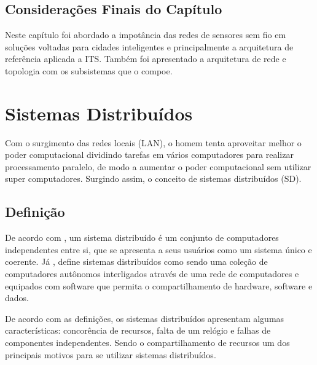 \documentclass[
	12pt,				%
	oneside,			%
	a4paper,			%
	english,			%
	brazil				%
	]{abntex2ppgsi}
\begin{document}

\section{Considerações Finais do Capítulo}

Neste capítulo foi abordado a impotância das redes de sensores sem fio em soluções voltadas para cidades inteligentes e principalmente  a arquitetura de referência aplicada a ITS. Também foi apresentado a arquitetura de rede e topologia com os subsistemas que o compoe.

\chapter{Sistemas Distribuídos}

Com o surgimento das redes locais (LAN), o homem tenta aproveitar melhor o poder computacional dividindo tarefas em vários computadores para realizar processamento paralelo, de modo a aumentar o poder computacional sem utilizar super computadores. Surgindo assim, o conceito de sistemas distribuídos (SD).

\section{Definição}

De acordo com , um sistema distribuído é um conjunto de computadores independentes entre si, que se apresenta a seus usuários como um sistema único e coerente. Já  , define sistemas distribuídos como sendo uma coleção de computadores autônomos interligados através de uma rede de computadores e equipados com software que permita o compartilhamento de hardware, software e dados.

De acordo com as definições, os sistemas distribuídos apresentam algumas características: concorência de recursos,  falta de um relógio e falhas de componentes independentes. Sendo o compartilhamento de recursos um dos principais motivos para se utilizar sistemas distribuídos. 
\end{document}
